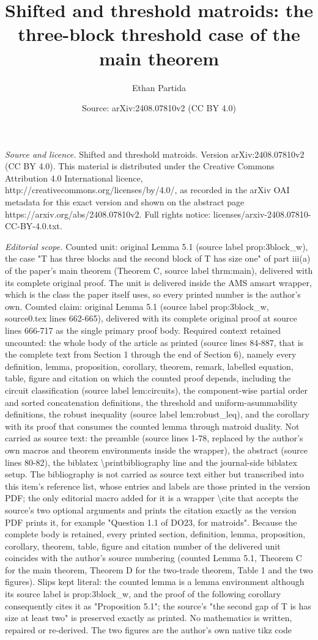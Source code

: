 \documentclass[10pt,a4paper]{amsart}
\title[Shifted and Threshold Matroids: Lemma5.1]{Shifted and threshold matroids: the three-block threshold case of the main theorem}
\author{Ethan Partida}
\date{Source: arXiv:2408.07810v2 (CC BY 4.0)}
\theoremstyle{definition}
\theoremstyle{plain}
\begin{document}
\maketitle
\noindent\emph{Source and licence.} Shifted and threshold matroids. Version arXiv:2408.07810v2 (CC BY 4.0). This material is distributed under the Creative Commons Attribution 4.0 International licence, http://creativecommons.org/licenses/by/4.0/, as recorded in the arXiv OAI metadata for this exact version and shown on the abstract page https://arxiv.org/abs/2408.07810v2. Full rights notice: licenses/arxiv-2408.07810-CC-BY-4.0.txt.\par\smallskip
\noindent\textit{Editorial scope.} Counted unit: original Lemma 5.1 (source label prop:3block\_w), the case "T has three blocks and the second block of T has size one" of part iii(a) of the paper's main theorem (Theorem C, source label thrm:main), delivered with its complete original proof. The unit is delivered inside the AMS amsart wrapper, which is the class the paper itself uses, so every printed number is the author's own. Counted claim: original Lemma 5.1 (source label prop:3block\_w, source0.tex lines 662-665), delivered with its complete original proof at source lines 666-717 as the single primary proof body. Required context retained uncounted: the whole body of the article as printed (source lines 84-887, that is the complete text from Section 1 through the end of Section 6), namely every definition, lemma, proposition, corollary, theorem, remark, labelled equation, table, figure and citation on which the counted proof depends, including the circuit classification (source label lem:circuits), the component-wise partial order and sorted concatenation definitions, the threshold and uniform-asummability definitions, the robust inequality (source label lem:robust\_leq), and the corollary with its proof that consumes the counted lemma through matroid duality. Not carried as source text: the preamble (source lines 1-78, replaced by the author's own macros and theorem environments inside the wrapper), the abstract (source lines 80-82), the biblatex \textbackslash printbibliography line and the journal-side biblatex setup. The bibliography is not carried as source text either but transcribed into this item's reference list, whose entries and labels are those printed in the version PDF; the only editorial macro added for it is a wrapper \textbackslash cite that accepts the source's two optional arguments and prints the citation exactly as the version PDF prints it, for example "Question 1.1 of DO23, for matroids". Because the complete body is retained, every printed section, definition, lemma, proposition, corollary, theorem, table, figure and citation number of the delivered unit coincides with the author's source numbering (counted Lemma 5.1, Theorem C for the main theorem, Theorem D for the two-trade theorem, Table 1 and the two figures). Slips kept literal: the counted lemma is a lemma environment although its source label is prop:3block\_w, and the proof of the following corollary consequently cites it as "Proposition 5.1"; the source's "the second gap of T is has size at least two" is preserved exactly as printed. No mathematics is written, repaired or re-derived. The two figures are the author's own native tikz code 
\end{document}
